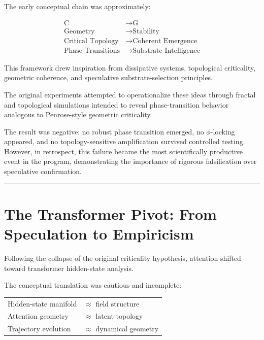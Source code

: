 \documentclass[12pt,a4paper]{article}
\begin{document}
The early conceptual chain was approximately:

\begin{center}
\begin{minipage}{0.6\textwidth}
\begin{align*}
\text{C} &\rightarrow \text{G} \\
\text{Geometry} &\rightarrow \text{Stability} \\
\text{Critical Topology} &\rightarrow \text{Coherent Emergence} \\
\text{Phase Transitions} &\rightarrow \text{Substrate Intelligence}
\end{align*}
\end{minipage}
\end{center}

This framework drew inspiration from dissipative systems, topological criticality, geometric coherence, and speculative substrate-selection principles.

The original experiments attempted to operationalize these ideas through fractal and topological simulations intended to reveal phase-transition behavior analogous to Penrose-style geometric criticality.

The result was negative: no robust phase transition emerged, no $\phi$-locking appeared, and no topology-sensitive amplification survived controlled testing. However, in retrospect, this failure became the most scientifically productive event in the program, demonstrating the importance of rigorous falsification over speculative confirmation.

\medskip
\hrule
\medskip

\section{The Transformer Pivot: From Speculation to Empiricism}

Following the collapse of the original criticality hypothesis, attention shifted toward transformer hidden-state analysis.

The conceptual translation was cautious and incomplete:

\begin{center}
\begin{tabular}{ll}
Hidden-state manifold & $\approx$ field structure \\
Attention geometry & $\approx$ latent topology \\
Trajectory evolution & $\approx$ dynamical geometry
\end{tabular}
\end{center}
\end{document}
